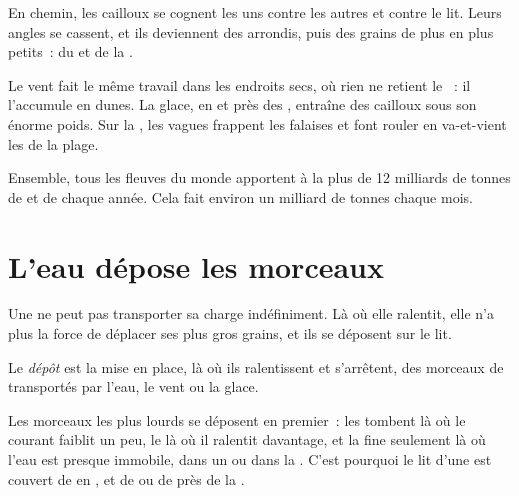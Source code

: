 En chemin, les cailloux se cognent les uns contre les autres et contre le
lit. Leurs angles se cassent, et ils deviennent des  arrondis, puis
des grains de plus en plus petits~: du  et de la .

Le vent fait le même travail dans les endroits secs, où rien ne retient le
~: il l'accumule en dunes. La glace, en  et près des ,
entraîne des cailloux sous son énorme poids. Sur la , les vagues
frappent les falaises et font rouler en va-et-vient les  de la plage.

\begin{remark}[Combien~?]\label{rem:g5:water-shapes-the-land:how-much}
Ensemble, tous les fleuves du monde apportent à la  plus de
12 milliards de tonnes de  et de  chaque année. Cela fait environ
un milliard de tonnes chaque mois.
\end{remark}

\section{L'eau dépose les morceaux}

Une  ne peut pas transporter sa charge indéfiniment. Là où elle
ralentit, elle n'a plus la force de déplacer ses plus gros grains, et ils
se déposent sur le lit.

\begin{definition}[Dépôt]\label{def:g5:water-shapes-the-land:deposition}
Le \emph{dépôt} est la mise en place, là où ils
ralentissent et s'arrêtent, des morceaux de  transportés par l'eau,
le vent ou la glace.
\end{definition}

Les morceaux les plus lourds se déposent en premier~: les  tombent là
où le courant faiblit un peu, le  là où il ralentit davantage, et la
 fine seulement là où l'eau est presque immobile, dans un  ou dans
la . C'est pourquoi le lit d'une  est couvert de  en
, et de  ou de  près de la .


